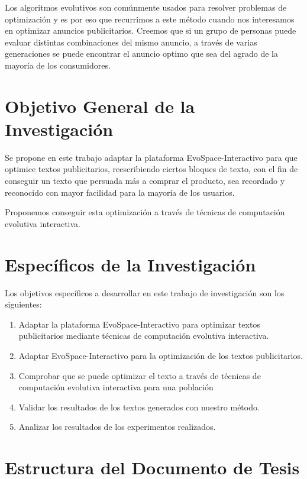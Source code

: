 Los algoritmos evolutivos son comúnmente usados para resolver problemas de optimización \cite{jong2006evolutionary} y es por eso que recurrimos a este método cuando nos interesamos en optimizar anuncios publicitarios. Creemos que si un grupo de personas puede evaluar distintas combinaciones del mismo anuncio, a través de varias generaciones se puede encontrar el anuncio optimo que sea del agrado de la mayoría de los consumidores.


\clearpage
\section{Objetivo General de la Investigación}

Se propone en este trabajo adaptar la plataforma EvoSpace-Interactivo para que optimice textos publicitarios, reescribiendo ciertos bloques de texto, con el fin de conseguir un texto que persuada más a comprar el producto, sea recordado y reconocido con mayor facilidad para la mayoría de  los usuarios.

Proponemos conseguir esta optimización a través de técnicas de computación evolutiva interactiva.

\clearpage
\section{Específicos de la Investigación}

Los objetivos específicos a desarrollar en este trabajo de investigación son los siguientes:

\begin{enumerate}
\item Adaptar la plataforma EvoSpace-Interactivo para optimizar textos publicitarios mediante técnicas de computación evolutiva interactiva.
\item Adaptar EvoSpace-Interactivo para la optimización de los textos publicitarios.
\item Comprobar que se puede optimizar el texto a través de técnicas de computación evolutiva interactiva para una población
\item Validar los resultados de los textos generados con nuestro método.
\item Analizar los resultados de los experimentos realizados.
\end{enumerate}

\clearpage
\section{Estructura del Documento de Tesis}

